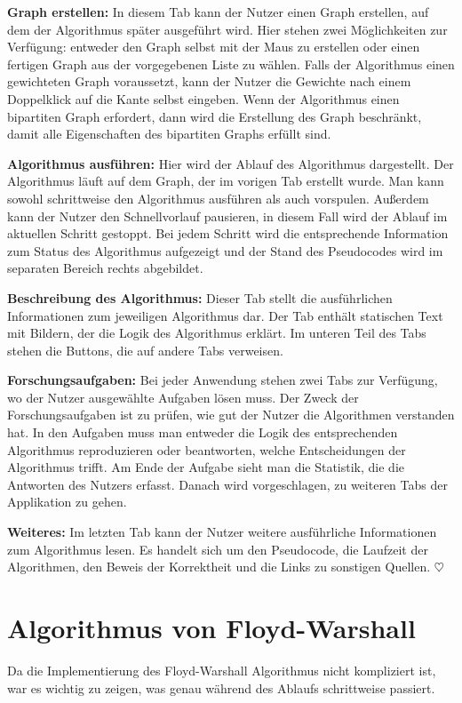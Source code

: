 \noindent\textbf{Graph erstellen:} In diesem Tab kann der Nutzer einen Graph erstellen, auf dem der Algorithmus später ausgeführt wird. Hier stehen zwei Möglichkeiten zur Verfügung: entweder den Graph selbst mit der Maus zu erstellen oder einen fertigen Graph aus der vorgegebenen Liste zu wählen. Falls der Algorithmus einen gewichteten Graph voraussetzt, kann der Nutzer die Gewichte nach einem Doppelklick auf die Kante selbst eingeben. Wenn der Algorithmus einen bipartiten Graph erfordert, dann wird die Erstellung des Graph beschränkt, damit alle Eigenschaften des bipartiten Graphs erfüllt sind. 

\noindent\textbf{Algorithmus ausführen:} Hier wird der Ablauf des Algorithmus dargestellt. Der Algorithmus läuft auf dem Graph, der im vorigen Tab erstellt wurde. Man kann sowohl schrittweise den Algorithmus ausführen als auch vorspulen. Außerdem kann der Nutzer den Schnellvorlauf pausieren, in diesem Fall wird der Ablauf im aktuellen Schritt gestoppt. Bei jedem Schritt wird die entsprechende Information zum Status des Algorithmus aufgezeigt und der Stand des Pseudocodes wird im separaten Bereich rechts abgebildet.

\noindent\textbf{Beschreibung des Algorithmus:} Dieser Tab stellt die ausführlichen Informationen zum jeweiligen Algorithmus dar. Der Tab enthält statischen Text mit Bildern, der die Logik des Algorithmus erklärt. Im unteren Teil des Tabs stehen die Buttons, die auf andere Tabs verweisen.

\noindent\textbf{Forschungsaufgaben:} Bei jeder Anwendung stehen zwei Tabs zur Verfügung, wo der Nutzer ausgewählte Aufgaben lösen muss. Der Zweck der Forschungsaufgaben ist zu prüfen, wie gut der Nutzer die Algorithmen verstanden hat. In den Aufgaben muss man entweder die Logik des entsprechenden Algorithmus reproduzieren oder beantworten, welche Entscheidungen der Algorithmus trifft. Am Ende der Aufgabe sieht man die Statistik, die die Antworten des Nutzers erfasst. Danach wird vorgeschlagen, zu weiteren Tabs der Applikation zu gehen.

\noindent\textbf{Weiteres:} Im letzten Tab kann der Nutzer weitere ausführliche Informationen zum Algorithmus lesen. Es handelt sich um den Pseudocode, die Laufzeit der Algorithmen, den Beweis der Korrektheit und die Links zu sonstigen Quellen. \hfill$\heartsuit$

\section{Algorithmus von Floyd-Warshall} %
Da die Implementierung des Floyd-Warshall Algorithmus nicht kompliziert ist, war es wichtig zu zeigen, was genau während des Ablaufs schrittweise passiert. 

